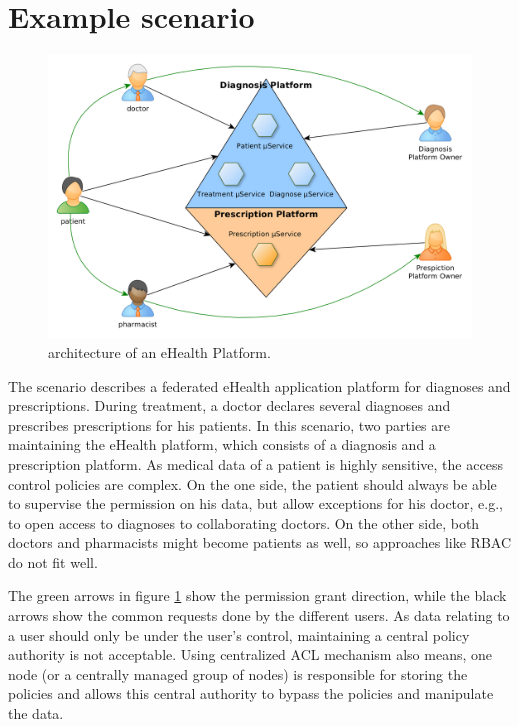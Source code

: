 \documentclass[12pt, conference]{IEEEtran}
\begin{document}
\section{Example scenario}

\begin{figure}[!h]
\centering
  \includegraphics[width=\linewidth]{figures/platform.png}
  \caption{architecture of an eHealth Platform.}
  \label{fig:platform}
\end{figure}

The scenario describes a federated eHealth application platform for diagnoses and prescriptions. During treatment, a doctor declares several diagnoses and prescribes prescriptions for his patients. In this scenario, two parties are maintaining the eHealth platform, which consists of a diagnosis and a prescription platform. As medical data of a patient is highly sensitive, the access control policies are complex. On the one side, the patient should always be able to supervise the permission on his data, but allow exceptions for his doctor, e.g., to open access to diagnoses to collaborating doctors. On the other side, both doctors and pharmacists might become patients as well, so approaches like RBAC do not fit well. 

The green arrows in figure \ref{fig:platform} show the permission grant direction, while the black arrows show the common requests done by the different users. As data relating to a user should only be under the user's control, maintaining a central policy authority is not acceptable. Using centralized ACL mechanism also means, one node (or a centrally managed group of nodes) is responsible for storing the policies and allows this central authority to bypass the policies and manipulate the data.
\end{document}
